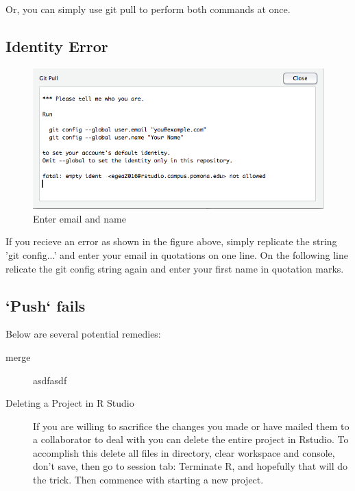 \documentclass[12pt]{../SOP3_beta}
\begin{document}
\NP Or, you can simply use git pull to perform both commands at once.

\subsection {Identity Error}
\begin{figure}[H]
\includegraphics{graphics/IdentityError.png}
\caption{Enter email and name}
\end{figure}

\NP If you recieve an error as shown in the figure above, simply replicate the string 'git config...' and enter your email in quotations on one line. On the following line relicate the git config string again and enter your first name in quotation marks. 

\subsection{`Push` fails}

\NP Below are several potential remedies:

\begin{description}
  \item[merge] asdfasdf
  
  \item[Deleting a Project in R Studio]If you are willing to sacrifice the changes you made or have mailed them to a collaborator to deal with you can delete the entire project in Rstudio. To accomplish this delete all files in directory, clear workspace and console, don't save, then go to session tab: Terminate R, and hopefully that will do the trick. Then commence with starting a new project. 

\end{description}

\end{document}
